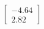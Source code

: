 \documentclass[preview]{standalone}
\begin{document}
\begin{align*}
\begin{bmatrix} -4.64 \\ 2.82 \end{bmatrix}
\end{align*}
\end{document}
